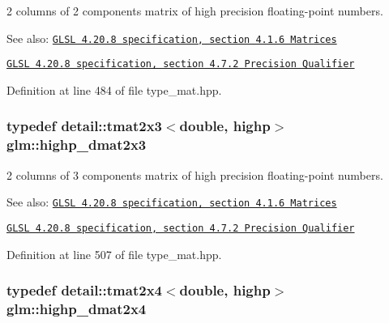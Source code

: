 2 columns of 2 components matrix of high precision floating-point numbers.

\begin{Desc}
\item[See also:]\href{http://www.opengl.org/registry/doc/GLSLangSpec.4.20.8.pdf}{\tt GLSL 4.20.8 specification, section 4.1.6 Matrices} 

\href{http://www.opengl.org/registry/doc/GLSLangSpec.4.20.8.pdf}{\tt GLSL 4.20.8 specification, section 4.7.2 Precision Qualifier} \end{Desc}


Definition at line 484 of file type\_\-mat.hpp.\hypertarget{group__core__precision_gfec7367665f006f2a7643103c5eddc38}{
\subsubsection[highp\_\-dmat2x3]{\setlength{\rightskip}{0pt plus 5cm}typedef detail::tmat2x3$<$double, highp$>$ {\bf glm::highp\_\-dmat2x3}}}
\label{group__core__precision_gfec7367665f006f2a7643103c5eddc38}


2 columns of 3 components matrix of high precision floating-point numbers.

\begin{Desc}
\item[See also:]\href{http://www.opengl.org/registry/doc/GLSLangSpec.4.20.8.pdf}{\tt GLSL 4.20.8 specification, section 4.1.6 Matrices} 

\href{http://www.opengl.org/registry/doc/GLSLangSpec.4.20.8.pdf}{\tt GLSL 4.20.8 specification, section 4.7.2 Precision Qualifier} \end{Desc}


Definition at line 507 of file type\_\-mat.hpp.\hypertarget{group__core__precision_gcd51d8188f7d66a83c035b8c4cd69f2d}{
\subsubsection[highp\_\-dmat2x4]{\setlength{\rightskip}{0pt plus 5cm}typedef detail::tmat2x4$<$double, highp$>$ {\bf glm::highp\_\-dmat2x4}}}
\label{group__core__precision_gcd51d8188f7d66a83c035b8c4cd69f2d}


